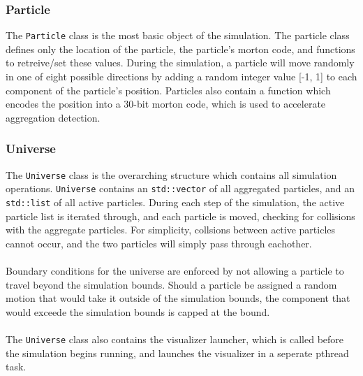 \documentclass[fleqn,10pt]{UserGuideArx} %
\begin{document}
\subsubsection{Particle}
The \texttt{Particle} class is the most basic object of the simulation. The particle class defines only the location of the particle, the particle’s morton code, and functions to retreive/set these values. During the simulation, a particle will move randomly in one of eight possible directions by adding a random integer value [-1, 1] to each component of the particle’s position. Particles also contain a function which encodes the position into a 30-bit morton code, which is used to accelerate aggregation detection.\\

\subsubsection{Universe}
The \texttt{Universe} class is the overarching structure which contains all simulation operations. \texttt{Universe} contains an \texttt{std\allowbreak::vector} of all aggregated particles, and an \texttt{std\allowbreak::list} of all active particles. During each step of the simulation, the active particle list is iterated through, and each particle is moved, checking for collisions with the aggregate particles. For simplicity, collsions between active particles cannot occur, and the two particles will simply pass through eachother. \\~\\
Boundary conditions for the universe are enforced by not allowing a particle to travel beyond the simulation bounds. Should a particle be assigned a random motion that would take it outside of the simulation bounds, the component that would exceede the simulation bounds is capped at the bound. \\~\\
The \texttt{Universe} class also contains the visualizer launcher, which is called before the simulation begins running, and launches the visualizer in a seperate pthread task.\\
\end{document}
